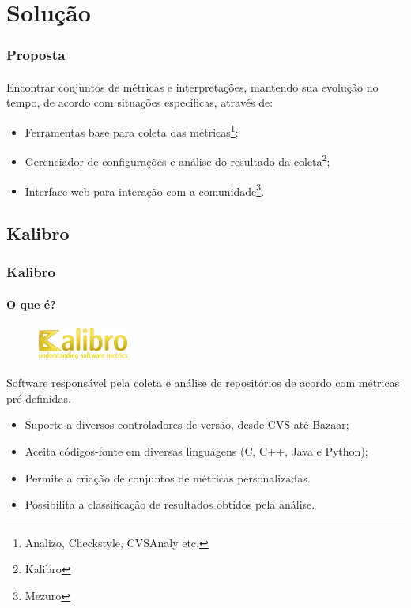\documentclass{beamer}
\begin{document}
\section{Solução}
  
\begin{frame}
  \frametitle{Proposta}
  \framesubtitle{}
  
  Encontrar conjuntos de métricas e interpretações, mantendo sua evolução no tempo, de acordo com situações específicas, através de:
  \begin{itemize}
    \item Ferramentas base para coleta das métricas\footnote{Analizo, Checkstyle, CVSAnaly etc.};
    \item Gerenciador de configurações e análise do resultado da coleta\footnote{Kalibro};
    \item Interface web para interação com a comunidade\footnote{Mezuro}.
  \end{itemize}
  

\end{frame}

  \subsection{Kalibro}
  
  \begin{frame}
    \frametitle{Kalibro}
    \framesubtitle{O que é?}
    
    \begin{figure}
      \begin{flushleft}
        \includegraphics[width=3cm, height=1.125cm]{images/logo-kalibro.png}
        \label{fig:logo-kalibro}
      \end{flushleft}
    \end{figure}
    
    Software responsável pela coleta e análise de repositórios de acordo com métricas pré-definidas.
    \begin{itemize}
      \item Suporte a diversos controladores de versão, desde CVS até Bazaar;
      \item Aceita códigos-fonte em diversas linguagens (C, C++, Java e Python);
      \item Permite a criação de conjuntos de métricas personalizadas.
      \item Possibilita a classificação de resultados obtidos pela análise.
    \end{itemize}
  \end{frame}
  
\end{document}
